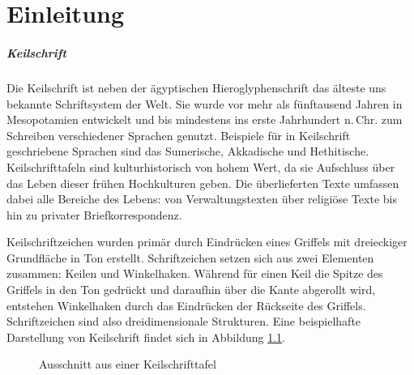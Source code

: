 \chapter{Einleitung}
\label{chap:ein}




\paragraph{Keilschrift}

Die Keilschrift ist neben der ägyptischen Hieroglyphenschrift das älteste uns bekannte Schriftsystem 
der Welt. Sie wurde vor mehr als fünftausend Jahren in Mesopotamien entwickelt und bis mindestens 
ins erste Jahrhundert n.\,Chr. zum Schreiben verschiedener Sprachen genutzt. Beispiele für in 
Keilschrift geschriebene Sprachen sind das Sumerische, Akkadische und Hethitische. Keilschrifttafeln 
sind kulturhistorisch von hohem Wert, da sie Aufschluss über das Leben dieser frühen Hochkulturen geben. 
Die überlieferten Texte umfassen dabei alle Bereiche des Lebens: von Verwaltungstexten über religiöse 
Texte bis hin zu privater Briefkorrespondenz. \cite{Rot15}

Keilschriftzeichen wurden primär durch Eindrücken eines Griffels mit dreieckiger Grundfläche in Ton erstellt.
%
Schriftzeichen setzen sich aus zwei Elementen zusammen: Keilen und Winkelhaken. 
Während für einen Keil die Spitze des Griffels in den Ton gedrückt und daraufhin über die Kante abgerollt wird, 
entstehen Winkelhaken durch das Eindrücken der Rückseite des Griffels. Schriftzeichen sind also dreidimensionale
Strukturen. \cite{stylus}
Eine beispielhafte Darstellung von Keilschrift findet sich in Abbildung \ref{abb1}.

\begin{figure}[h]
	\centering
	\caption[Bla]{Ausschnitt aus einer Keilschrifttafel \protect\footnotemark} \label{abb1}
\end{figure}



